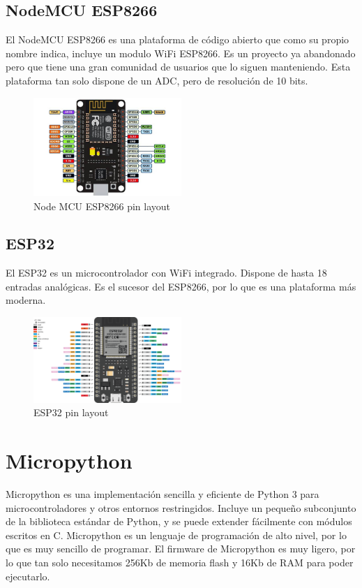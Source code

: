 \begin{titlepage}
\subsection{ NodeMCU ESP8266}
El NodeMCU ESP8266\cite{ref10} es una plataforma de código abierto que como su propio nombre indica, incluye un modulo WiFi ESP8266. Es un proyecto ya abandonado pero que tiene una gran comunidad de usuarios que lo siguen manteniendo. Esta plataforma tan solo dispone de un ADC, pero de resolución de 10 bits. \\
\begin{figure}[h!]
	\centering
	\includegraphics[width=0.5\textwidth]{imagenes/esp8266.jpg}
	\caption{Node MCU ESP8266 pin layout\cite{esp8266_img}}
\end{figure}
\subsection{ESP32}
El ESP32\cite{ref11} es un microcontrolador con WiFi integrado. Dispone de hasta 18 entradas analógicas. Es el sucesor del ESP8266, por lo que es una plataforma más moderna. \\
\begin{figure}[h!]
	\centering
	\includegraphics[width=0.5\textwidth]{imagenes/esp32.png}
	\caption{ESP32 pin layout\cite{esp32_img}}
\end{figure}

\section{Micropython}
Micropython \cite{ref12} es una implementación sencilla y eficiente de Python 3 para microcontroladores y otros entornos restringidos. Incluye un pequeño subconjunto de la biblioteca estándar de Python, y se puede extender fácilmente con módulos escritos en C. Micropython es un lenguaje de programación de alto nivel, por lo que es muy sencillo de programar. El firmware de Micropython es muy ligero, por lo que tan solo necesitamos 256Kb de memoria flash y 16Kb de RAM para poder ejecutarlo. \\


\end{titlepage}
